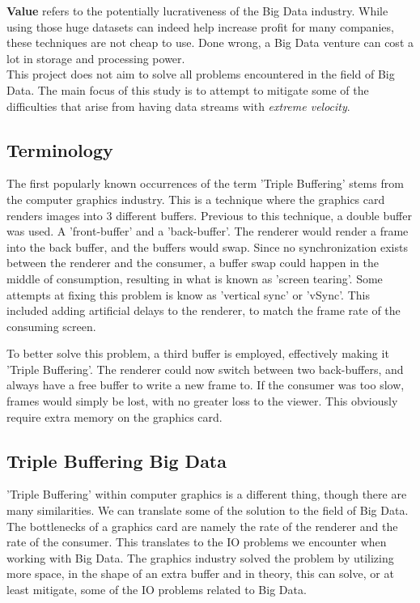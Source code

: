 \documentclass[a4paper]{article}
\begin{document}
\textbf{Value} refers to the potentially lucrativeness of the Big Data industry. While using those huge datasets can indeed help increase profit for many companies, these techniques are not cheap to use. Done wrong, a Big Data venture can cost a lot in storage and processing power.\\


This project does not aim to solve all problems encountered in the field of Big Data. The main focus of this study is to attempt to mitigate some of the difficulties that arise from having data streams with \textit{extreme velocity}. 


\subsection{Terminology}
The first popularly known occurrences of the term 'Triple Buffering' stems from the computer graphics industry. This is a technique where the graphics card renders images into 3 different buffers. Previous to this technique, a double buffer was used. A 'front-buffer' and a 'back-buffer'. The renderer would render a frame into the back buffer, and the buffers would swap. Since no synchronization exists between the renderer and the consumer, a buffer swap could happen in the middle of consumption, resulting in what is known as 'screen tearing'. Some attempts at fixing this problem is know as 'vertical sync' or 'vSync'. This included adding artificial delays to the renderer, to match the frame rate of the consuming screen.

To better solve this problem, a third buffer is employed, effectively making it 'Triple Buffering'. The renderer could now switch between two back-buffers, and always have a free buffer to write a new frame to. If the consumer was too slow, frames would simply be lost, with no greater loss to the viewer. This obviously require extra memory on the graphics card.\\


\subsection{Triple Buffering Big Data}
'Triple Buffering' within computer graphics is a different thing, though there are many similarities. We can translate some of the solution to the field of Big Data. The bottlenecks of a graphics card are namely the rate of the renderer and the rate of the consumer. This translates to the IO problems we encounter when working with Big Data. The graphics industry solved the problem by utilizing more space, in the shape of an extra buffer and in theory, this can solve, or at least mitigate, some of the IO problems related to Big Data.\\
\end{document}
